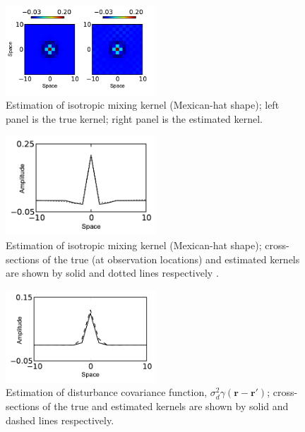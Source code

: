 \documentclass[10pt,twocolumn,twoside]{IEEEtran}
\begin{document}
 \begin{figure}[!h] 
 \centering
 \includegraphics[width=0.5\textwidth]{./Graph/KernelEstimation2d.pdf}
 \caption{Estimation of isotropic mixing kernel (Mexican-hat shape); left panel is the true kernel; right panel is the estimated kernel.}
 \label{fig:MexHatKernel2d}
 \end{figure}
 \begin{figure}[!h] 
 \centering
 \includegraphics[width=0.5\textwidth]{./Graph/KernelSupportEstimation1d.pdf}
 \caption{Estimation of isotropic mixing kernel (Mexican-hat shape);  cross-sections of the true (at observation locations) and estimated kernels are shown by solid and dotted lines respectively .}
 \label{fig:MexHatKernel1d}
 \end{figure}  
\begin{figure}[!h] 
 \centering
 \includegraphics[width=0.5\textwidth]{./Graph/DisturbanceSupportEstimation1d.pdf}
 \caption{Estimation of disturbance covariance function, $\sigma_d^2\gamma(\mathbf{r}-\mathbf{r'})$;  cross-sections of the true and estimated  kernels  are shown by solid and dashed lines respectively.}
 \label{fig:EstimatedSupport1d}
 \end{figure} 
\end{document}
